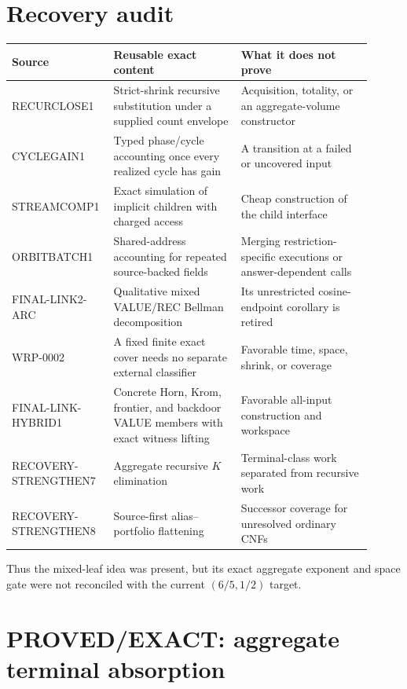 \documentclass[11pt]{article}
\begin{document}
\section{Recovery audit}

\begin{center}
\begin{tabular}{>{\raggedright\arraybackslash}p{0.22\linewidth}
                >{\raggedright\arraybackslash}p{0.34\linewidth}
                >{\raggedright\arraybackslash}p{0.35\linewidth}}
\toprule
Source & Reusable exact content & What it does not prove \\
\midrule
RECURCLOSE1 & Strict-shrink recursive substitution under a supplied count
envelope & Acquisition, totality, or an aggregate-volume constructor \\
CYCLEGAIN1 & Typed phase/cycle accounting once every realized cycle has gain
& A transition at a failed or uncovered input \\
STREAMCOMP1 & Exact simulation of implicit children with charged access
& Cheap construction of the child interface \\
ORBITBATCH1 & Shared-address accounting for repeated source-backed fields
& Merging restriction-specific executions or answer-dependent calls \\
FINAL-LINK2-ARC & Qualitative mixed VALUE/REC Bellman decomposition
& Its unrestricted cosine-endpoint corollary is retired \\
WRP-0002 & A fixed finite exact cover needs no separate external classifier
& Favorable time, space, shrink, or coverage \\
FINAL-LINK-HYBRID1 & Concrete Horn, Krom, frontier, and backdoor VALUE members
with exact witness lifting & Favorable all-input construction and workspace \\
RECOVERY-STRENGTHEN7 & Aggregate recursive $K$ elimination
& Terminal-class work separated from recursive work \\
RECOVERY-STRENGTHEN8 & Source-first alias--portfolio flattening
& Successor coverage for unresolved ordinary CNFs \\
\bottomrule
\end{tabular}
\end{center}

Thus the mixed-leaf idea was present, but its exact aggregate exponent and
space gate were not reconciled with the current $(6/5,1/2)$ target.

\section{PROVED/EXACT: aggregate terminal absorption}
\end{document}

